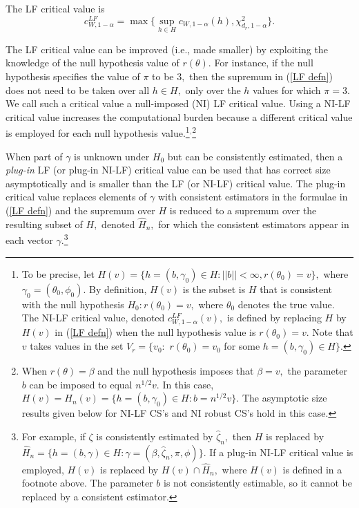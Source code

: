 \documentclass[12pt,titlepage,final,oneside,letterpaper]{article}
\begin{document}
\hspace{0.25in}The LF critical value is%
\begin{equation}
c_{W,1-\alpha }^{LF}=\max \{\sup_{h\in H}c_{W,1-\alpha }(h),\chi
_{d_{r},1-\alpha }^{2}\}.  \label{LF defn}
\end{equation}

The LF critical value can be improved (i.e., made smaller) by exploiting the
knowledge of the null hypothesis value of $r(\theta ).$ For instance, if the
null hypothesis specifies the value of $\pi $ to be $3,$ then the supremum
in (\ref{LF defn}) does not need to be taken over all $h\in H,$ only over
the $h$ values for which $\pi =3.$ We call such a critical value a
null-imposed (NI) LF critical value. Using a NI-LF critical value increases
the computational burden because a different critical value is employed for
each null hypothesis value.\footnote{%
To be precise, let $H(v)=\{h=(b,\gamma _{0})\in H:||b||<\infty ,r(\theta
_{0})=v\},$ where $\gamma _{0}=(\theta _{0},\phi _{0}).$ By definition, $%
H(v) $ is the subset is $H$ that is consistent with the null hypothesis $%
H_{0}:r(\theta _{0})=v,$ where $\theta _{0}$ denotes the true value. The
NI-LF critical value, denoted $c_{W,1-\alpha }^{LF}(v),$ is defined by
replacing $H$ by $H(v)$ in (\ref{LF defn}) when the null hypothesis value is 
$r(\theta _{0})=v.$ Note that $v$ takes values in the set $V_{r}=\{v_{0}:$ $%
r(\theta _{0})=v_{0}$ for some $h=(b,\gamma _{0})\in H\}.$}$^{,}$\footnote{%
When $r(\theta )=\beta $ and the null hypothesis imposes that $\beta =v,$
the parameter $b$ can be imposed to equal $n^{1/2}v.$ In this case, $%
H(v)=H_{n}(v)=\{h=(b,\gamma _{0})\in H:b=n^{1/2}v\}.$ The asymptotic size
results given below for NI-LF CS's and NI robust CS's hold in this case.}

When part of $\gamma $ is unknown under $H_{0}$ but can be consistently
estimated, then a \emph{plug-in} LF (or plug-in NI-LF) critical value can be
used that has correct size asymptotically and is smaller than the LF (or
NI-LF) critical value. The plug-in critical value replaces elements of $%
\gamma $ with consistent estimators in the formulae in (\ref{LF defn}) and
the supremum over $H$ is reduced to a supremum over the resulting subset of $%
H,$ denoted $\widehat{H}_{n},$ for which the consistent estimators appear in
each vector $\gamma .$\footnote{%
For example, if $\zeta $ is consistently estimated by $\widehat{\zeta }_{n},$
then $H$ is replaced by $\widehat{H}_{n}=\{h=(b,\gamma )\in H:\gamma =(\beta
,\widehat{\zeta }_{n},\pi ,\phi )\}.$ If a plug-in NI-LF critical value is
employed, $H(v)$ is replaced by $H(v)\cap \widehat{H}_{n},$ where $H(v)$ is
defined in a footnote above. The parameter $b$ is not consistently
estimable, so it cannot be replaced by a consistent estimator.}
\end{document}
